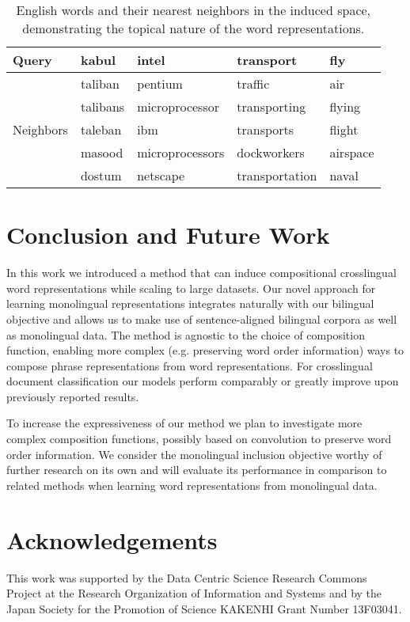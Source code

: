 \documentclass{article} \usepackage{iclr2015,times}
\begin{document}
\begin{table}[t]
    \caption{English words and their nearest neighbors in the
    induced space, demonstrating the topical nature of the word representations.}
    \label{tab:examples-english}
    \begin{center}
    \small
    \begin{tabular}{lllll}
    \toprule
     Query                      & kabul    & intel           & transport      & fly      \\
    \midrule
     \multirow{5}{*}{Neighbors} & taliban  & pentium         & traffic        & air      \\
                                & talibans & microprocessor  & transporting   & flying   \\
                                & taleban  & ibm             & transports     & flight   \\
                                & masood   & microprocessors & dockworkers    & airspace \\
                                & dostum   & netscape        & transportation & naval    \\
    \bottomrule
    \end{tabular}
    \end{center}
\end{table}

\section{Conclusion and Future Work}

In this work we introduced a method that can induce compositional
crosslingual word representations while scaling to large datasets.
Our novel approach for learning monolingual representations
integrates naturally with our bilingual objective and
allows us to make use of sentence-aligned bilingual corpora as well as
monolingual data.
The method is agnostic to the choice of composition function, enabling more
complex (e.g. preserving word order information) ways to compose phrase
representations from word representations.
For crosslingual document classification \citep{klementiev2012inducing} our
models perform comparably or greatly improve upon previously reported results.

To increase the expressiveness of our method we plan to investigate more complex
composition functions, possibly based on convolution to preserve word order information.
We consider the monolingual inclusion objective worthy of further
research on its own and will evaluate its performance in comparison to
related methods when learning word representations from monolingual data.

\section*{Acknowledgements}

This work was supported by the
Data Centric Science Research Commons Project at the
Research Organization of Information and Systems
and by the
Japan Society for the Promotion of Science KAKENHI Grant Number 13F03041.



\end{document}
